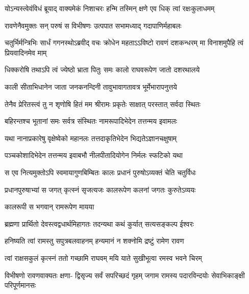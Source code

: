 \twolineshloka
{योऽन्यस्त्वेवंविधं ब्रूयाद् वाक्यमेकं निशाचरः}
{हन्मि तस्मिन् क्षणे एव धिक् त्वां रक्षःकुलाधमम्} %

\twolineshloka
{रावणेनैवमुक्तः सन् परुषं स विभीषणः}
{उत्पपात सभामध्याद् गदापाणिर्महाबलः} %

\threelineshloka
{चतुर्भिर्मन्त्रिभिः सार्धं गगनस्थोऽब्रवीद् वचः}
{क्रोधेन महताऽऽविष्टो रावणं दशकन्धरम्}
{मा विनाशमुपैहि त्वं प्रियवादिनमेव माम्} %

\twolineshloka
{धिक्करोषि तथाऽपि त्वं ज्येष्ठो भ्राता पितुः समः}
{कालो राघवरूपेण जातो दशरथालये} %

\twolineshloka
{काली सीताभिधानेन जाता जनकनन्दिनी}
{तावुभावागतावत्र भूर्मेभारापनुत्तये} %

\twolineshloka
{तेनैव प्रेरितस्त्वं तु न शृणोषि हितं मम}
{श्रीरामः प्रकृतेः साक्षात् परस्तात् सर्वदा स्थितः} %

\twolineshloka
{बहिरन्तश्च भूतानां समः सर्वत्र संस्थितः}
{नामरूपादिभेदेन तत्तन्मय इवामलः} %

\twolineshloka
{यथा नानाप्रकारेषु वृक्षेष्वेको महानलः}
{तत्तदाकृतिभेदेन भिद्यतेऽज्ञानचक्षुषाम्} %

\twolineshloka
{पञ्चकोशादिभेदेन तत्तन्मय इवाबभौ}
{नीलपीतादियोगेन निर्मलः स्फटिको यथा} %

\twolineshloka
{स एव नित्यमुक्तोऽपि स्वमायागुणबिम्बितः}
{कालः प्रधानं पुरुषोऽव्यक्तं चेति चतुर्विधः} %

\twolineshloka
{प्रधानपुरुषाभ्यां स जगत् कृत्स्नं सृजत्यजः}
{कालरूपेण कलनां जगतः कुरुतेऽव्ययः} %

{कालरूपी स भगवान् रामरूपेण मायया} %


\twolineshloka
{ब्रह्मणा प्रार्थितो देवस्त्वद्वधार्थमिहागतः}
{तदन्यथा कथं कुर्यात् सत्यसङ्कल्प ईश्वरः} %

\twolineshloka
{हनिष्यति त्वां रामस्तु सपुत्रबलवाहनम्}
{हन्यमानं न शक्नोमि द्रष्टुं रामेण रावण} %

\twolineshloka
{त्वां राक्षसकुलं कृत्स्नं ततो गच्छामि राघवम्}
{मयि याते सुखीभूत्वा रमस्व भवने चिरम्} %

\fourlineindentedshloka
{विभीषणो रावणवाक्यतः क्षणा-}
{द्विसृज्य सर्वं सपरिच्छदं गृहम्}
{जगाम रामस्य पदारविन्दयोः}
{सेवाभिकाङ्क्षी परिपूर्णमानसः} %






